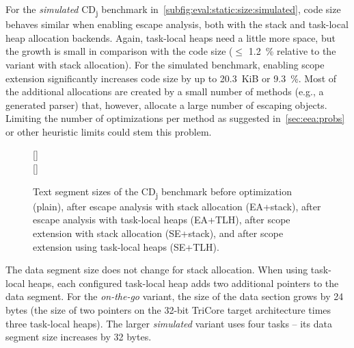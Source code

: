 		For the \emph{simulated} CD\textsubscript{j} benchmark in~\cref{subfig:eval:static:size:simulated}, code size
		behaves similar when enabling escape analysis, both with the stack and task-local heap allocation backends. Again,
		task-local heaps need a little more space, but the growth is small in comparison with the code size ($\le$ 1.2~\%
		relative to the variant with stack allocation). For the simulated benchmark, enabling scope extension significantly
		increases code size by up to 20.3~KiB or 9.3~\%. Most of the additional allocations are created by a small number of
		methods (e.g., a generated parser) that, however, allocate a large number of escaping objects. Limiting the number
		of optimizations per method as suggested in~\cref{sec:eea:probs} or other heuristic limits could stem this problem.

		\begin{figure}
			\centering
			[\textwidth]{%
				\centering%
			}\\[2ex]
			[\textwidth]{%
				\centering%
			}%
			\caption[CD\textsubscript{j} text segment sizes]{%
				Text segment sizes of the CD\textsubscript{j} benchmark before optimization (plain), after escape analysis with
				stack allocation (EA+stack), after escape analysis with task-local heaps (EA+TLH), after scope extension with
				stack allocation (SE+stack), and after scope extension using task-local heaps (SE+TLH).}%
			\label{fig:eval:static:size}
		\end{figure}

		The data segment size does not change for stack allocation. When using task-local heaps, each configured task-local
		heap adds two additional pointers to the data segment. For the \emph{on-the-go} variant, the size of the data
		section grows by 24 bytes (the size of two pointers on the 32-bit TriCore target architecture times three task-local
		heaps). The larger \emph{simulated} variant uses four tasks – its data segment size increases by 32 bytes.

